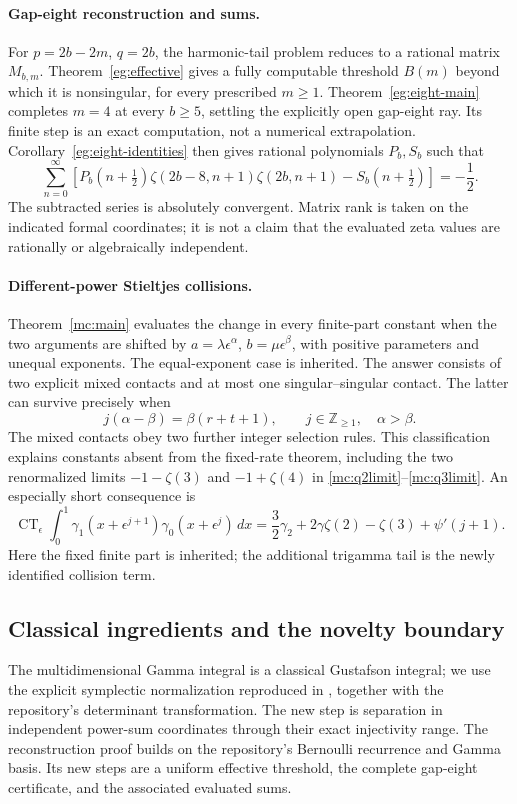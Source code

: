 \paragraph{Gap-eight reconstruction and sums.}
For $p=2b-2m$, $q=2b$, the harmonic-tail problem reduces to a rational
matrix $M_{b,m}$. Theorem~\ref{eg:effective} gives a fully computable
threshold $B(m)$ beyond which it is nonsingular, for every prescribed
$m\ge1$. Theorem~\ref{eg:eight-main} completes $m=4$ at every $b\ge5$,
settling the explicitly open gap-eight ray. Its finite step is an exact
computation, not a numerical extrapolation. Corollary~\ref{eg:eight-identities}
then gives rational polynomials $P_b,S_b$ such that
\[
 \sum_{n=0}^{\infty}\left[
 P_b(n+\tfrac12)\zeta(2b-8,n+1)\zeta(2b,n+1)
       -S_b(n+\tfrac12)\right]=-\frac12.
\]
The subtracted series is absolutely convergent. Matrix rank is taken on
the indicated formal coordinates; it is not a claim that the evaluated
zeta values are rationally or algebraically independent.

\paragraph{Different-power Stieltjes collisions.}
Theorem~\ref{mc:main} evaluates the change in every finite-part constant
when the two arguments are shifted by
$a=\lambda\epsilon^\alpha$, $b=\mu\epsilon^\beta$, with positive
parameters and unequal exponents. The equal-exponent case is inherited.
The answer consists of two explicit mixed contacts and at most one
singular--singular contact. The latter can survive precisely when
\[
 j(\alpha-\beta)=\beta(r+t+1),\qquad j\in\mathbb Z_{\ge1},
 \quad\alpha>\beta.
\]
The mixed contacts obey two further integer selection rules. This
classification explains constants absent from the fixed-rate theorem,
including the two renormalized limits $-1-\zeta(3)$ and $-1+\zeta(4)$
in \eqref{mc:q2limit}--\eqref{mc:q3limit}.
An especially short consequence is
\[
 \operatorname{CT}_{\epsilon}\int_0^1
 \gamma_1(x+\epsilon^{j+1})\gamma_0(x+\epsilon^j)\,dx
 =\frac32\gamma_2+2\gamma\zeta(2)-\zeta(3)+\psi'(j+1).
\]
Here the fixed finite part is inherited; the additional trigamma tail
is the newly identified collision term.

\subsection{Classical ingredients and the novelty boundary}

The multidimensional Gamma integral is a classical Gustafson integral;
we use the explicit symplectic normalization reproduced in
\cite[Eq.~(2)]{DerkachovManashov}, together with the repository's
determinant transformation. The new step is separation in independent
power-sum coordinates through their exact injectivity range.
The reconstruction proof builds on the repository's Bernoulli recurrence
and Gamma basis. Its new steps are a uniform effective threshold,
the complete gap-eight certificate, and the associated evaluated sums.

